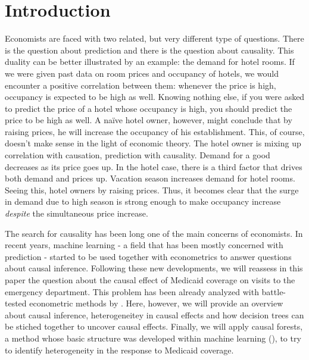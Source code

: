 \section{Introduction}

Economists are faced with two related, but very different type of questions. There is the question about prediction and there is the question about causality. This duality can be better illustrated by an example: the demand for hotel rooms. If we were given past data on room prices and occupancy of hotels, we would encounter a positive correlation between them: whenever the price is high, occupancy is expected to be high as well. Knowing nothing else, if you were asked to predict the price of a hotel whose occupancy is high, you should predict the price to be high as well. A naïve hotel owner, however, might conclude that by raising prices, he will increase the occupancy of his establishment. This, of course, doesn't make sense in the light of economic theory. The hotel owner is mixing up correlation with causation, prediction with causality. Demand for a good decreases as its price goes up. In the hotel case, there is a third factor that drives both demand and prices up. Vacation season increases demand for hotel rooms. Seeing this, hotel owners by raising prices. Thus, it becomes clear that the surge in demand due to high season is strong enough to make occupancy increase \textit{despite} the simultaneous price increase.

The search for causality has been long one of the main concerns of economists. In recent years, machine learning - a field that has been mostly concerned with prediction - started to be used together with econometrics to answer questions about causal inference. Following these new developments, we will reassess in this paper the question about the causal effect of Medicaid coverage on visits to the emergency department. This problem has been already analyzed with battle-tested econometric methods by \cite{taubmanMedicaidIncreasesEmergencyDepartment2014} . Here, however, we will provide an overview about causal inference, heterogeneitey in causal effects and how decision trees can be stiched together to uncover causal effects. Finally, we will apply causal forests, a method whose basic structure was developed within machine learning (\cite{breimanRandomForests2001}), to try to identify heterogeneity in the response to Medicaid coverage.



\newpage

